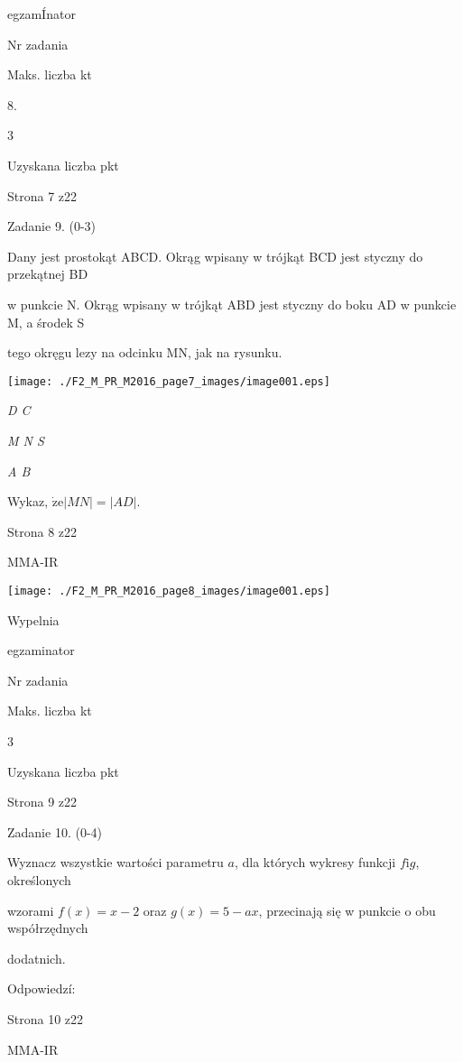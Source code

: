 \documentclass[a4paper,12pt]{article}
\begin{document}
egzamÍnator

Nr zadania

Maks. liczba kt

8.

3

Uzyskana liczba pkt

Strona 7 z22





Zadanie 9. (0-3)

Dany jest prostokąt ABCD. Okrąg wpisany w trójkąt BCD jest styczny do przekątnej BD

w punkcie N. Okrąg wpisany w trójkąt ABD jest styczny do boku AD w punkcie M, a środek S

tego okręgu lezy na odcinku MN, jak na rysunku.
\begin{center}
\texttt{[image: ./F2\_M\_PR\_M2016\_page7\_images/image001.eps]}
\end{center}
{\it D C}

{\it M  N  S}

{\it A  B}

Wykaz, $\dot{\mathrm{z}}\mathrm{e}|MN|=|AD|.$

Strona 8 z22

MMA-IR




\begin{center}
\texttt{[image: ./F2\_M\_PR\_M2016\_page8\_images/image001.eps]}
\end{center}
Wypelnia

egzaminator

Nr zadania

Maks. liczba kt

3

Uzyskana liczba pkt

Strona 9 z22





Zadanie 10. (0-4)

Wyznacz wszystkie wartości parametru $a$, dla których wykresy funkcji $f\mathrm{i}g$, określonych

wzorami $f(x)=x-2$ oraz $g(x)=5-ax$, przecinają się w punkcie o obu współrzędnych

dodatnich.

Odpowiedzí:

Strona 10 z22

MMA-IR
\end{document}

